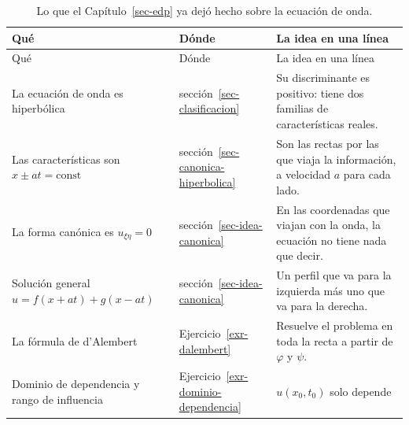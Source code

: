 \documentclass[
  spanish,
  a4paper,
]{scrbook}
\theoremstyle{definition}
\theoremstyle{plain}
\theoremstyle{definition}
\theoremstyle{plain}
\theoremstyle{definition}
\theoremstyle{remark}
\begin{document}
\begin{longtable}[]{@{}
  >{\raggedright\arraybackslash}p{}
  >{\raggedright\arraybackslash}p{}
  >{\raggedright\arraybackslash}p{}@{}}
\caption{Lo que el Capítulo~\ref{sec-edp} ya dejó hecho sobre la
ecuación de onda.}\label{tbl-hip-ya-vimos}\tabularnewline
\toprule\noalign{}
\begin{minipage}[b]{\linewidth}\raggedright
Qué
\end{minipage} & \begin{minipage}[b]{\linewidth}\raggedright
Dónde
\end{minipage} & \begin{minipage}[b]{\linewidth}\raggedright
La idea en una línea
\end{minipage} \\
\midrule\noalign{}
\endfirsthead
\toprule\noalign{}
\begin{minipage}[b]{\linewidth}\raggedright
Qué
\end{minipage} & \begin{minipage}[b]{\linewidth}\raggedright
Dónde
\end{minipage} & \begin{minipage}[b]{\linewidth}\raggedright
La idea en una línea
\end{minipage} \\
\midrule\noalign{}
\endhead
\bottomrule\noalign{}
\endlastfoot
La ecuación de onda es hiperbólica & sección~\ref{sec-clasificacion} &
Su discriminante es positivo: tiene dos familias de características
reales. \\
Las características son \(x\pm at=\text{const}\) &
sección~\ref{sec-canonica-hiperbolica} & Son las rectas por las que
viaja la información, a velocidad \(a\) para cada lado. \\
La forma canónica es \(u_{\xi\eta}=0\) & sección~\ref{sec-idea-canonica}
& En las coordenadas que viajan con la onda, la ecuación no tiene nada
que decir. \\
Solución general \(u=f(x+at)+g(x-at)\) & sección~\ref{sec-idea-canonica}
& Un perfil que va para la izquierda más uno que va para la derecha. \\
La fórmula de d'Alembert & Ejercicio~\ref{exr-dalembert} & Resuelve el
problema en toda la recta a partir de \(\varphi\) y \(\psi\). \\
Dominio de dependencia y rango de influencia &
Ejercicio~\ref{exr-dominio-dependencia} & \(u(x_0,t_0)\) solo depende

\end{longtable}
\end{document}

